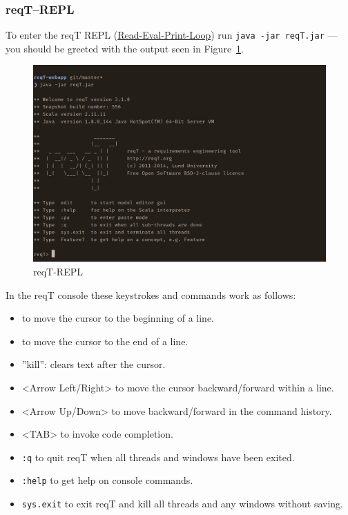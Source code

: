 \documentclass[11pt]{article}
\begin{document}
\subsubsection{reqT--REPL}

To enter the reqT REPL (\href{https://en.wikipedia.org/wiki/Read\%E2\%80\%93eval\%E2\%80\%93print\_loop}{Read-Eval-Print-Loop})
run \texttt{java -jar reqT.jar} --- you should be greeted with the output seen in Figure~\ref{figure:reqt-repl}.

\begin{figure}[H]
  \centering
    \includegraphics[width=\textwidth]{reqt-repl}
  \caption{reqT-REPL}
  \label{figure:reqt-repl}
\end{figure}

In the reqT console these keystrokes and commands work as follows:
{\footnotesize 
\begin{itemize}[label={}]
\item <Ctrl+A> to move the cursor to the beginning of a line.
\item <Ctrl+E> to move the cursor to the end of a line.
\item <Ctrl+K> ''kill'': clears text after the cursor.
\item <Arrow Left/Right> to move the cursor backward/forward within a line. 
\item <Arrow Up/Down> to move backward/forward in the command history. 
\item <TAB> to invoke code completion.
\item \verb+:q+ to quit reqT when all threads and windows have been exited.
\item \verb+:help+ to get help on console commands.
\item \verb+sys.exit+ to exit reqT and kill all threads and any windows without saving.
\end{itemize}
}
\end{document}
